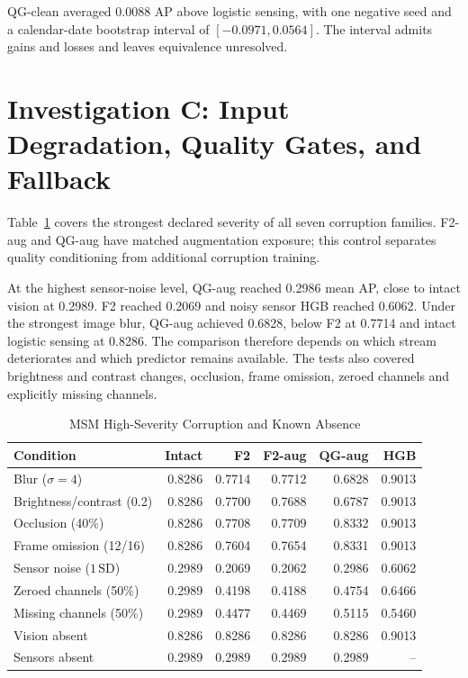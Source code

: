 QG-clean averaged $0.0088$ AP above logistic sensing, with one negative seed and a
calendar-date bootstrap interval of $[-0.0971, 0.0564]$. The interval admits gains and
losses and leaves equivalence unresolved.

\section{Investigation C: Input Degradation, Quality Gates, and Fallback}
Table~\ref{tab:msm-robustness} covers the strongest declared severity of all seven
corruption families. F2-aug and QG-aug have matched augmentation exposure; this control
separates quality conditioning from additional corruption training.

At the highest sensor-noise level, QG-aug reached 0.2986 mean AP, close to intact
vision at 0.2989. F2 reached 0.2069 and noisy sensor HGB reached 0.6062. Under the
strongest image blur, QG-aug achieved 0.6828, below F2 at 0.7714 and intact logistic
sensing at 0.8286. The comparison therefore depends on which stream deteriorates and
which predictor remains available. The tests also covered brightness and contrast
changes, occlusion, frame omission, zeroed channels and explicitly missing channels.


\begin{table}[htbp]
\caption{MSM High-Severity Corruption and Known Absence}\label{tab:msm-robustness}
\centering\small\setlength{\tabcolsep}{4pt}
\begin{tabular}{lrrrrr}\toprule
Condition & Intact & F2 & F2-aug & QG-aug & HGB\\\midrule
Blur ($\sigma=4$) & 0.8286 & 0.7714 & 0.7712 & 0.6828 & 0.9013\\
Brightness/contrast (0.2) & 0.8286 & 0.7700 & 0.7688 & 0.6787 & 0.9013\\
Occlusion (40\%) & 0.8286 & 0.7708 & 0.7709 & 0.8332 & 0.9013\\
Frame omission (12/16) & 0.8286 & 0.7604 & 0.7654 & 0.8331 & 0.9013\\
Sensor noise ($1\,\mathrm{SD}$) & 0.2989 & 0.2069 & 0.2062 & 0.2986 & 0.6062\\
Zeroed channels (50\%) & 0.2989 & 0.4198 & 0.4188 & 0.4754 & 0.6466\\
Missing channels (50\%) & 0.2989 & 0.4477 & 0.4469 & 0.5115 & 0.5460\\
Vision absent & 0.8286 & 0.8286 & 0.8286 & 0.8286 & 0.9013\\
Sensors absent & 0.2989 & 0.2989 & 0.2989 & 0.2989 & --\\
\bottomrule\end{tabular}
\end{table}

